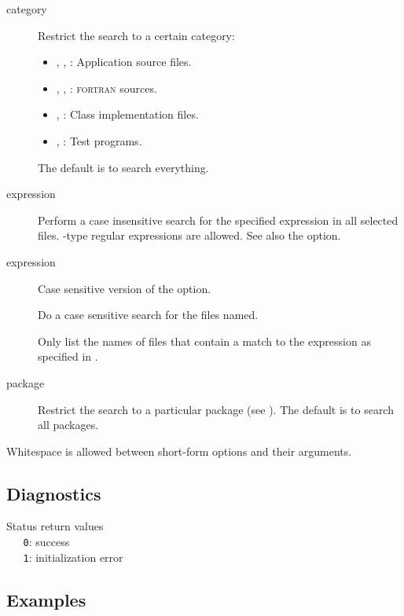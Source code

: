 \begin{description}
\item[ category]
   Restrict the search to a certain category:
   \begin{itemize}
      \item
      , , : Application source files.

      \item
      , , : \textsc{fortran} sources.

      \item
      , : Class implementation files.

      \item
      , : Test programs.
   \end{itemize}
   The default is to search everything.

\item[ expression]
   Perform a case insensitive search for the specified expression in all
   selected files.  -type regular expressions are allowed.
   See also the  option.

\item[ expression]
   Case sensitive version of the  option.

\item[]
   Do a case sensitive search for the files named.

\item[]
   Only list the names of files that contain a match to the expression 
   as specified in .

\item[ package]
   Restrict the search to a particular package (see ).
   The default is to search all packages.
\end{description}

\noindent
Whitespace is allowed between short-form options and their arguments.

\subsection*{Diagnostics}

Status return values
\\ \verb+   0+:  success
\\ \verb+   1+:  initialization error

\subsection*{Examples}

